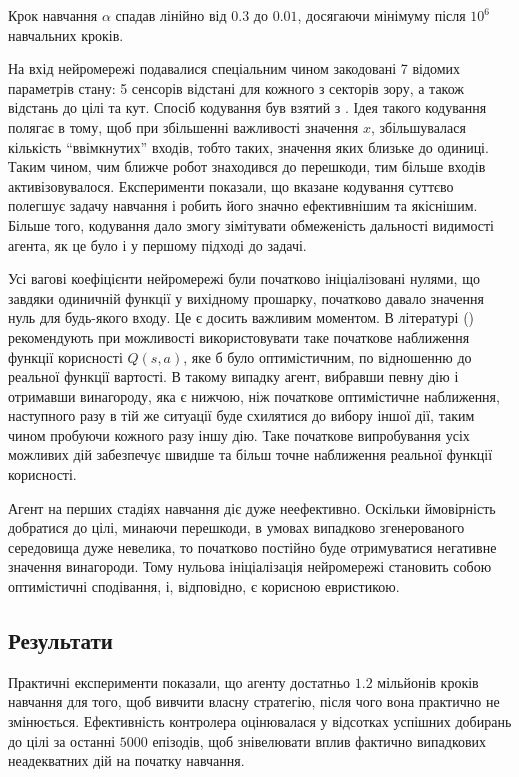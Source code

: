 \documentclass[a4paper,10pt,fleqn]{article}
\begin{document}
Крок навчання $\alpha$ спадав лінійно від $0.3$ до $0.01$, досягаючи мінімуму після $10^6$ навчальних кроків.

На вхід нейромережі подавалися спеціальним чином закодовані 7 відомих параметрів стану: 5 сенсорів відстані для кожного з секторів зору, а також відстань до цілі та кут. Спосіб кодування був взятий з \cite{Rummery1995}. Ідея такого кодування полягає в тому, щоб при збільшенні важливості значення $x$, збільшувалася кількість ``ввімкнутих'' входів, тобто таких, значення яких близьке до одиниці. Таким чином, чим ближче робот знаходився до перешкоди, тим більше входів активізовувалося. Експерименти показали, що вказане кодування суттєво полегшує задачу навчання і робить його значно ефективнішим та якіснішим. Більше того, кодування дало змогу зімітувати обмеженість дальності видимості агента, як це було і у першому підході до задачі.


Усі вагові коефіцієнти нейромережі були початково ініціалізовані нулями, що завдяки одиничній функції у вихідному прошарку, початково давало значення нуль для будь-якого входу. Це є досить важливим моментом. В літературі (\cite{SuttonBarto2002}) рекомендують при можливості використовувати таке початкове наближення функції корисності $Q(s,a)$, яке б було оптимістичним, по відношенню до реальної функції вартості. В такому випадку агент, вибравши певну дію і отримавши винагороду, яка є нижчою, ніж початкове оптимістичне наближення, наступного разу в тій же ситуації буде схилятися до вибору іншої дії, таким чином пробуючи кожного разу іншу дію. Таке початкове випробування усіх можливих дій забезпечує швидше та більш точне наближення реальної функції корисності.

Агент на перших стадіях навчання діє дуже неефективно. Оскільки ймовірність добратися до цілі, минаючи перешкоди, в умовах випадково згенерованого середовища дуже невелика, то початково постійно буде отримуватися негативне значення винагороди. Тому нульова ініціалізація нейромережі становить собою оптимістичні сподівання, і, відповідно, є корисною евристикою.

\subsection{Результати}

Практичні експерименти показали, що агенту достатньо $1.2$ мільйонів кроків навчання для того, щоб вивчити власну стратегію, після чого вона практично не змінюється. Ефективність контролера оцінювалася у відсотках успішних добирань до цілі за останні $5000$ епізодів, щоб знівелювати вплив фактично випадкових неадекватних дій на початку навчання.
\end{document}
